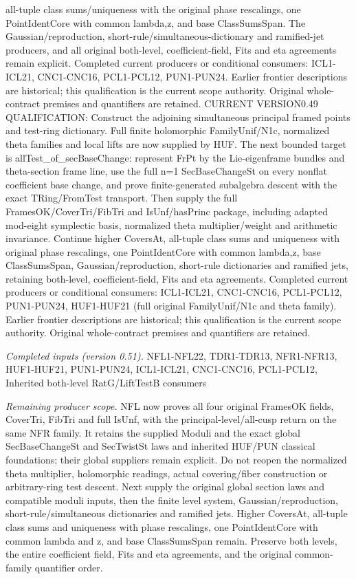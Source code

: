 all-tuple class sums/uniqueness with the original phase rescalings, one PointIdentCore with common lambda,z, and base ClassSumsSpan. The Gaussian/reproduction, short-rule/simultaneous-dictionary and ramified-jet producers, and all original both-level, coefficient-field, Fits and eta agreements remain explicit. Completed current producers or conditional consumers: ICL1-ICL21, CNC1-CNC16, PCL1-PCL12, PUN1-PUN24. Earlier frontier descriptions are historical; this qualification is the current scope authority. Original whole-contract premises and quantifiers are retained. CURRENT VERSION0.49 QUALIFICATION: Construct the adjoining simultaneous principal framed points and test-ring dictionary. Full finite holomorphic FamilyUnif/N1c, normalized theta families and local lifts are now supplied by HUF. The next bounded target is allTest\_\allowbreak of\_\allowbreak secBaseChange: represent FrPt by the Lie-eigenframe bundles and theta-section frame line, use the full n=1 SecBaseChangeSt on every nonflat coefficient base change, and prove finite-generated subalgebra descent with the exact TRing/FromTest transport. Then supply the full FramesOK/CoverTri/FibTri and IsUnf/hasPrinc package, including adapted mod-eight symplectic basis, normalized theta multiplier/weight and arithmetic invariance. Continue higher CoversAt, all-tuple class sums and uniqueness with original phase rescalings, one PointIdentCore with common lambda,z, base ClassSumsSpan, Gaussian/reproduction, short-rule dictionaries and ramified jets, retaining both-level, coefficient-field, Fits and eta agreements. Completed current producers or conditional consumers: ICL1-ICL21, CNC1-CNC16, PCL1-PCL12, PUN1-PUN24, HUF1-HUF21 (full original FamilyUnif/N1c and theta family). Earlier frontier descriptions are historical; this qualification is the current scope authority. Original whole-contract premises and quantifiers are retained.

\emph{Completed inputs (version 0.51).} NFL1-NFL22, TDR1-TDR13, NFR1-NFR13, HUF1-HUF21, PUN1-PUN24, ICL1-ICL21, CNC1-CNC16, PCL1-PCL12, Inherited both-level RatG/LiftTestB consumers

\emph{Remaining producer scope.} NFL now proves all four original FramesOK fields, CoverTri, FibTri and full IsUnf, with the principal-level/all-cusp return on the same NFR family. It retains the supplied Moduli and the exact global SecBaseChangeSt and SecTwistSt laws and inherited HUF/PUN classical foundations; their global suppliers remain explicit. Do not reopen the normalized theta multiplier, holomorphic readings, actual covering/fiber construction or arbitrary-ring test descent. Next supply the original global section laws and compatible moduli inputs, then the finite level system, Gaussian/reproduction, short-rule/simultaneous dictionaries and ramified jets. Higher CoversAt, all-tuple class sums and uniqueness with phase rescalings, one PointIdentCore with common lambda and z, and base ClassSumsSpan remain. Preserve both levels, the entire coefficient field, Fits and eta agreements, and the original common-family quantifier order.



